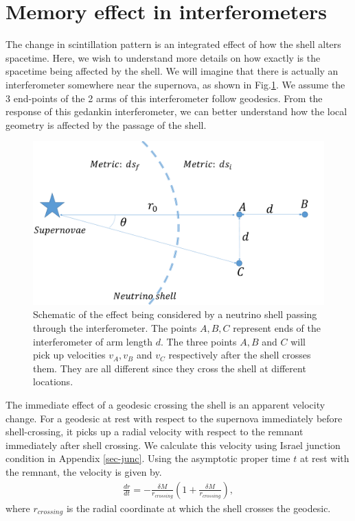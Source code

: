 \documentclass[aps,showpacs,onecolumn,floats,prd,superscriptaddress,nofootinbib]{revtex4-1}
\begin{document}
\section{Memory effect in interferometers}
\label{RelV}

The change in scintillation pattern is an integrated effect of how the shell alters spacetime.
Here, we wish to understand more details on how exactly is the spacetime being affected by the shell.
We will imagine that there is actually an interferometer somewhere near the supernova, as shown in Fig.\ref{fig:1}.
We assume the 3 end-points of the 2 arms of this interferometer follow geodesics.
From the response of this gedankin interferometer, we can better understand how the local geometry is affected by the passage of the shell.

\begin{figure}[h!]
\begin{center}
\includegraphics[scale = 0.27]{intro.pdf}
\caption{Schematic of the effect being considered by a neutrino shell passing through the interferometer. The points $A,B,C$ represent ends of the interferometer of arm length $d$. The three points $A,B$ and $C$ will pick up velocities $v_A, v_B$ and $v_C$ respectively after the shell crosses them. They are all different since they cross the shell at different locations.}
\label{fig:1}
\end{center}
\end{figure}

The immediate effect of a geodesic crossing the shell is an apparent velocity change.
For a geodesic at rest with respect to the supernova immediately before shell-crossing, it picks up a radial velocity with respect to the remnant immediately after shell crossing.
We calculate this velocity using Israel junction condition in Appendix \ref{sec-junc}.
Using the asymptotic proper time $t$ at rest with the remnant, the velocity is given by.
\begin{eqnarray}
	\frac{dr}{dt} = -\frac{\delta M}{r_{crossing}} \left( 1 + \frac{\delta M}{r_{crossing}} \right),
	\label{eq-dv}
\end{eqnarray}
where $r_{crossing}$ is the radial coordinate at which the shell crosses the geodesic.
\end{document}
